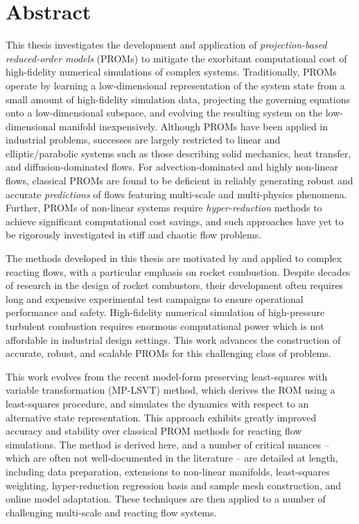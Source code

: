 \chapter{Abstract}

This thesis investigates the development and application of \textit{projection-based reduced-order models} (PROMs) to mitigate the exorbitant computational cost of high-fidelity numerical simulations of complex systems. Traditionally, PROMs operate by learning a low-dimensional representation of the system state from a small amount of high-fidelity simulation data, projecting the governing equations onto a low-dimensional subspace, and evolving the resulting system on the low-dimensional manifold inexpensively. Although PROMs have been applied in industrial problems, successes are largely restricted to linear and elliptic/parabolic systems such as those describing solid mechanics, heat transfer, and diffusion-dominated flows. For advection-dominated and highly non-linear flows, classical PROMs are found to be deficient in reliably generating robust and accurate {\em predictions} of flows featuring multi-scale and multi-physics phenomena. Further, PROMs of non-linear systems require \textit{hyper-reduction} methods to achieve significant computational cost savings, and such approaches have yet to be rigorously investigated in stiff and chaotic  flow problems.

The methods developed in this thesis are motivated by and applied to complex reacting flows, with a particular emphasis on rocket combustion.
Despite decades of research in the design of rocket combustors, their development often requires long and expensive experimental test campaigns to ensure operational performance and safety. High-fidelity numerical simulation of high-pressure turbulent combustion requires enormous computational power which is not affordable in industrial design settings. 
This work advances the construction of accurate, robust, and scalable PROMs for this challenging class of problems.

This work evolves from the recent model-form preserving least-squares with variable transformation (MP-LSVT) method, which derives the ROM using a least-squares procedure, and simulates the dynamics with respect to an alternative state representation. This approach exhibits greatly improved accuracy and stability over classical PROM methods for reacting flow simulations. The method is derived here, and a number of critical nuances -- which are often not well-documented in the literature -- are detailed at length, including data preparation, extensions to non-linear manifolds, least-squares weighting, hyper-reduction regression basis and sample mesh construction, and online model adaptation. These techniques are then applied to a number of challenging multi-scale and reacting flow systems.

